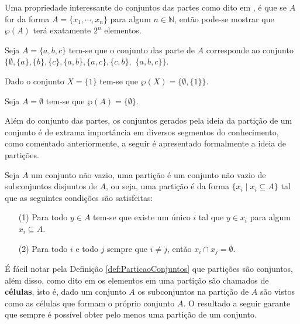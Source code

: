 Uma propriedade interessante do conjuntos das partes como dito em \cite{lipschutz1978-TC}, é que se $A$ for da forma $A = \{x_1, \cdots, x_n\}$ para algum $n \in \mathbb{N}$, então pode-se mostrar que $\wp(A)$ terá exatamente $2^n$ elementos.

\begin{exemplo}\label{exe:ConjuntoDasPartes1}
  Seja $A = \{a, b, c\}$ tem-se que o conjunto das parte de $A$ corresponde ao conjunto $\{\emptyset, \{a\}, \{b\}, \{c\}, \{a, b\},\{a, c\}, \{c, b\},$ $\{a, b, c\}\}$.
\end{exemplo}

\begin{exemplo}\label{exe:ConjuntoDasPartes2}
  Dado o conjunto $X = \{1\}$ tem-se que $\wp(X) = \{\emptyset, \{1\}\}$.
\end{exemplo}

\begin{exemplo}\label{exe:ConjuntoDasPartes3}
  Seja $A = \emptyset$ tem-se que $\wp(A) = \{\emptyset\}$.
\end{exemplo}

Além do conjunto das partes, os conjuntos gerados pela ideia da partição de um conjunto é de extrama importância em diversos segmentos do conhecimento, como comentado anteriormente, a seguir é apresentado formalmente a ideia de partições.

\begin{definicao}[Partição]\label{def:ParticaoConjuntos}
	Seja $A$ um conjunto não vazio, uma partição é um conjunto não vazio de subconjuntos disjuntos de $A$, ou seja, uma partição é da forma $\{x_i \mid x_i \subseteq A\}$ tal que as seguintes condições são satisfeitas:
	\begin{itemize}
		\item[(1)] Para todo $y \in A$ tem-se que existe um único $i$ tal que $y \in x_i$ para algum $x_i \subseteq A$.
		\item[(2)] Para todo $i$ e todo $j$ sempre que $i \neq j$, então $x_i \cap x_j = \emptyset$.
	\end{itemize}
\end{definicao}

É fácil notar pela Definição   \ref{def:ParticaoConjuntos}  que partições são conjuntos, além disso, como dito em \cite{lipschutz2013-MD} os elementos em uma partição são chamados de \textbf{células}, isto é, dado um conjunto $A$ os subconjuntos na partição de $A$ são vistos como as células que formam o próprio conjunto $A$. O resultado a seguir garante que sempre é possível obter pelo menos uma partição de um conjunto.

